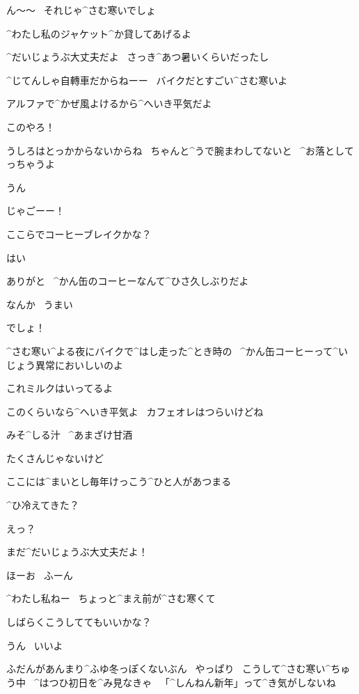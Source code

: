 \page[119]
\Alpha ん〜〜
\ それじゃ^{さむ}{寒}いでしょ

\Alpha ^{わたし}{私}のジャケット^{か}{貸}してあげるよ

\Takahiro ^{だいじょうぶ}{大丈夫}だよ
\ さっき^{あつ}{暑}いくらいだったし

\Alpha ^{じてんしゃ}{自轉車}だからねーー
\ バイクだとすごい^{さむ}{寒}いよ

\Takahiro アルファで^{かぜ}{風}よけるから^{へいき}{平気}だよ

\page[120]
\Alpha このやろ！

\Alpha うしろはとっかからないからね
\ ちゃんと^{うで}{腕}まわしてないと
\ ^{お}{落}としてっちゃうよ

\Takahiro うん

\Takahiro じゃごーー！

\page[122]
\Alpha ここらでコーヒーブレイクかな？

\Alpha はい

\Takahiro ありがと
\ ^{かん}{缶}のコーヒーなんて^{ひさ}{久}しぶりだよ

\page[123]
\Takahiro なんか
\ うまい

\Alpha でしょ！

\Alpha ^{さむ}{寒}い^{よる}{夜}にバイクで^{はし}{走}った^{とき}{時}の
\ ^{かん}{缶}コーヒーって^{いじょう}{異常}においしいのよ

\Takahiro これミルクはいってるよ

\Alpha このくらいなら^{へいき}{平気}よ
\ カフェオレはつらいけどね

\page[124]
\Sign みそ^{しる}{汁}
\ ^{あまざけ}{甘酒}

\page[125]
\Alpha たくさんじゃないけど

\Alpha ここには^{まいとし}{毎年}けっこう^{ひと}{人}があつまる

\Alpha ^{ひ}{冷}えてきた？

\Takahiro えっ？

\Takahiro まだ^{だいじょうぶ}{大丈夫}だよ！

\Alpha ほーお
\ ふーん

\Alpha ^{わたし}{私}ねー
\ ちょっと^{まえ}{前}が^{さむ}{寒}くて

\page[126]
\Alpha しばらくこうしててもいいかな？

\Takahiro うん
\ いいよ

\page[127]
\Alpha ふだんがあんまり^{ふゆ}{冬}っぽくないぶん
\ やっぱり
\ こうして^{さむ}{寒}い^{ちゅう}{中}
\ ^{はつひ}{初日}を^{み}{見}なきゃ
\ 「^{しんねん}{新年}」って^{き}{気}がしないね

